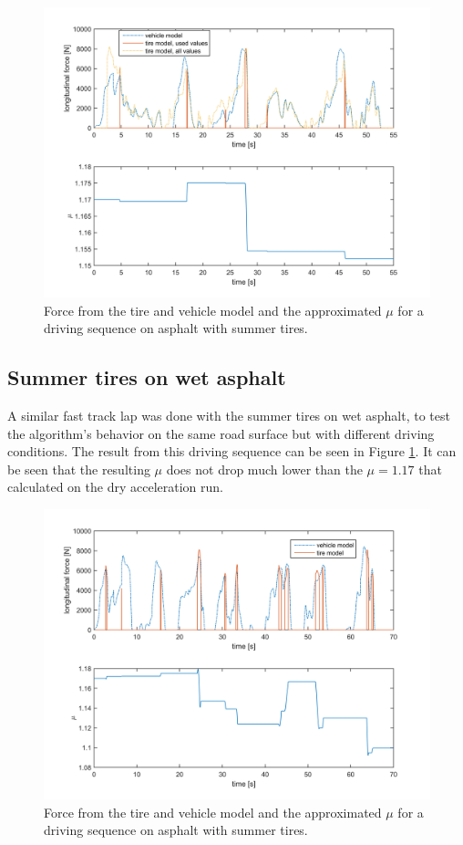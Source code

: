 \begin{figure}[h]
	\centering
	\includegraphics[width=1.0\textwidth]{Pictures/force_mue_race_bb}
	\caption {Force from the tire and vehicle model and the approximated $ \mu $ for a driving sequence on asphalt with summer tires.}
	\label{force_mue_race_bb}
\end{figure}

\subsection{Summer tires on wet asphalt}
A similar fast track lap was done with the summer tires on wet asphalt, to test the algorithm's behavior on the same road surface but with different driving conditions. The result from this driving sequence can be seen in Figure \ref{force_mue_race_bb}. It can be seen that the resulting $ \mu $ does not drop much lower than the $ \mu = 1.17 $ that calculated on the dry acceleration run. 

\begin{figure}[h]
	\centering
	\includegraphics[width=1.0\textwidth]{Pictures/force_mue_blot_race_bb}
	\caption {Force from the tire and vehicle model and the approximated $ \mu $ for a driving sequence on asphalt with summer tires.}
	\label{force_mue_blot_race_bb}
\end{figure}

